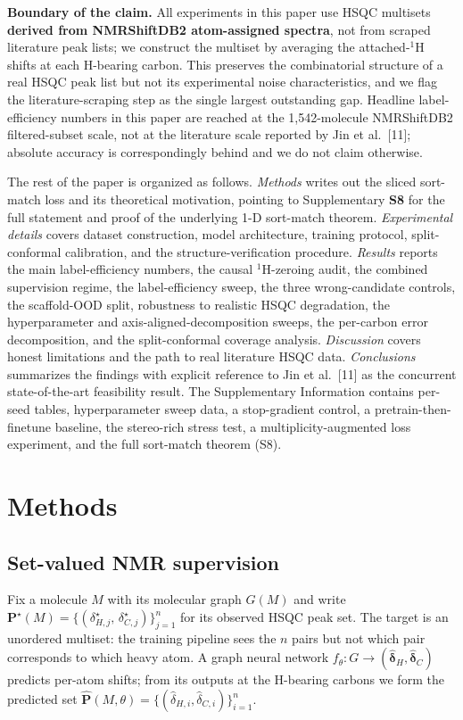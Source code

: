 \documentclass[
  11pt,
  a4paper,
]{article}
\begin{document}
\textbf{Boundary of the claim.} All experiments in this paper use HSQC
multisets \textbf{derived from NMRShiftDB2 atom-assigned spectra}, not
from scraped literature peak lists; we construct the multiset by
averaging the attached-\(^{1}\)H shifts at each H-bearing carbon. This
preserves the combinatorial structure of a real HSQC peak list but
not its experimental noise characteristics, and we flag the
literature-scraping step as the single largest outstanding gap.
Headline label-efficiency numbers in this paper are reached at the
1,542-molecule NMRShiftDB2 filtered-subset scale, not at the
literature scale reported by Jin et al.~{[}11{]}; absolute accuracy is
correspondingly behind and we do not claim otherwise.

The rest of the paper is organized as follows. \emph{Methods} writes out
the sliced sort-match loss and its theoretical motivation, pointing
to Supplementary \textbf{S8} for the full statement and proof of the
underlying 1-D sort-match theorem. \emph{Experimental details} covers
dataset construction, model architecture, training protocol,
split-conformal calibration, and the structure-verification
procedure. \emph{Results} reports the main label-efficiency numbers, the
causal \(^{1}\)H-zeroing audit, the combined supervision regime, the
label-efficiency sweep, the three wrong-candidate controls, the
scaffold-OOD split, robustness to realistic HSQC degradation, the
hyperparameter and axis-aligned-decomposition sweeps, the
per-carbon error decomposition, and the split-conformal coverage
analysis. \emph{Discussion} covers honest limitations and the path to
real literature HSQC data. \emph{Conclusions} summarizes the findings
with explicit reference to Jin et al.~{[}11{]} as the concurrent
state-of-the-art feasibility result. The Supplementary Information
contains per-seed tables, hyperparameter sweep data, a stop-gradient
control, a pretrain-then-finetune baseline, the stereo-rich stress
test, a multiplicity-augmented loss experiment, and the full
sort-match theorem (S8).

\section{Methods}\label{methods}

\subsection*{Set-valued NMR supervision}

Fix a molecule \(M\) with its molecular graph \(G(M)\) and write
\(\mathbf{P}^{\star}(M) = \{(\delta^{\star}_{H,j},\,\delta^{\star}_{C,j})\}_{j=1}^{n}\)
for its observed HSQC peak set. The target is an unordered multiset: the
training pipeline sees the \(n\) pairs but not which pair corresponds to
which heavy atom. A graph neural network
\(f_{\theta}: G \to (\hat{\boldsymbol{\delta}}_{H}, \hat{\boldsymbol{\delta}}_{C})\)
predicts per-atom shifts; from its outputs at the H-bearing carbons we
form the predicted set
\(\hat{\mathbf{P}}(M,\theta) =
\{(\hat{\delta}_{H,i},\hat{\delta}_{C,i})\}_{i=1}^{n}\).
\end{document}
